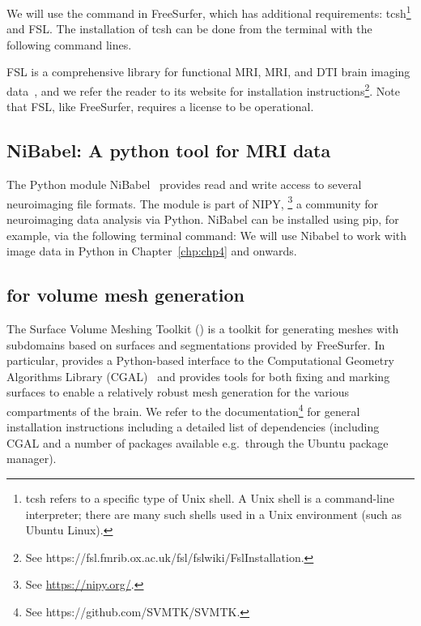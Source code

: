 We will use the command  in FreeSurfer, which has
additional requirements: tcsh\footnote{tcsh refers to a specific type of Unix 
shell.  A Unix shell is a command-line interpreter; there are many such shells 
used in a Unix environment (such as Ubuntu Linux).} and FSL. The installation 
of tcsh can be done from the terminal with the following command lines.

FSL is a comprehensive library for functional MRI, MRI, and DTI brain imaging
data~\cite{jenkinson2012fsl}, and we refer the reader to its website for
installation
instructions\footnote{See https://fsl.fmrib.ox.ac.uk/fsl/fslwiki/FslInstallation.}. Note
that FSL, like FreeSurfer, requires a license to be operational.

\subsection{NiBabel: A python tool for MRI data}
\label{sec:chp2:tools:nibabel-numpy}

The Python module NiBabel~\cite{brett_matthew_2020_4295521} provides read and write
access to several neuroimaging file formats. The module is part of
NIPY, \footnote{See \url{https://nipy.org/}.} a community for neuroimaging
data analysis via Python. NiBabel can be installed using pip, for example, via the  
following terminal command:
\noindent We will use Nibabel to work with image data in Python in 
Chapter~\ref{chp:chp4} and onwards.

\subsection{\svmtk{} for volume mesh generation}
\label{sec:chp2:tools:meshing:svmtk}

The Surface Volume Meshing Toolkit (\svmtk{}) is a toolkit for
generating meshes with subdomains based on surfaces and segmentations
provided by FreeSurfer. In particular, \svmtk{} provides a
Python-based interface to the Computational Geometry Algorithms
Library (CGAL)~\cite{fabri2000design} and provides tools for both
fixing and marking surfaces to enable a relatively robust mesh
generation for the various compartments of the brain.  We refer to the
\svmtk{} documentation\footnote{See https://github.com/SVMTK/SVMTK.} for
general installation instructions including a detailed list of
dependencies (including CGAL and a number of packages available
e.g.~through the Ubuntu package manager).

